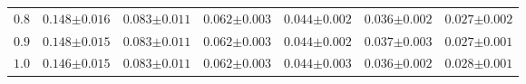 \begin{table}[!t]
{\begin{tabular}{c|cccccc}
        $0.8$ & $0.148{\scriptstyle\pm0.016}$ & $\mathbf{0.083{\scriptstyle\pm0.011}}$ & $0.062{\scriptstyle\pm0.003}$ & $0.044{\scriptstyle\pm0.002}$ & $0.036{\scriptstyle\pm0.002}$ & $0.027{\scriptstyle\pm0.002}$ \\
        $0.9$ & $0.148{\scriptstyle\pm0.015}$ & $0.083{\scriptstyle\pm0.011}$ & $0.062{\scriptstyle\pm0.003}$ & $0.044{\scriptstyle\pm0.002}$ & $0.037{\scriptstyle\pm0.003}$ & $0.027{\scriptstyle\pm0.001}$ \\
        $1.0$ & $\mathbf{0.146{\scriptstyle\pm0.015}}$ & $0.083{\scriptstyle\pm0.011}$ & $\mathbf{0.062{\scriptstyle\pm0.003}}$ & $\mathbf{0.044{\scriptstyle\pm0.003}}$ & $0.036{\scriptstyle\pm0.002}$ & $0.028{\scriptstyle\pm0.001}$ \\
        \bottomrule
    \end{tabular}%
    }
\end{table}
